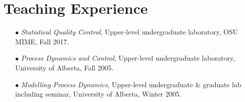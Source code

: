 \documentclass[10pt, letterpaper]{article}
\begin{document}
\section*{Teaching Experience} %
\vspace{5pt}
{\renewcommand{\arraystretch}{0.5}
\begin{itemize}
	\item[\tiny$\bullet$] {\it{Statistical Quality Control}}, Upper-level undergraduate laboratory, OSU MIME, Fall 2017.
	\item[\tiny$\bullet$] {\it{Process Dynamics and Control}}, Upper-level undergraduate laboratory, University of Alberta, Fall 2005.
	\item[\tiny$\bullet$] {\it{Modelling Process Dynamics}}, Upper-level undergraduate \& graduate lab including seminar, University of Alberta, Winter 2005.
\end{itemize}
%

}
\end{document}
